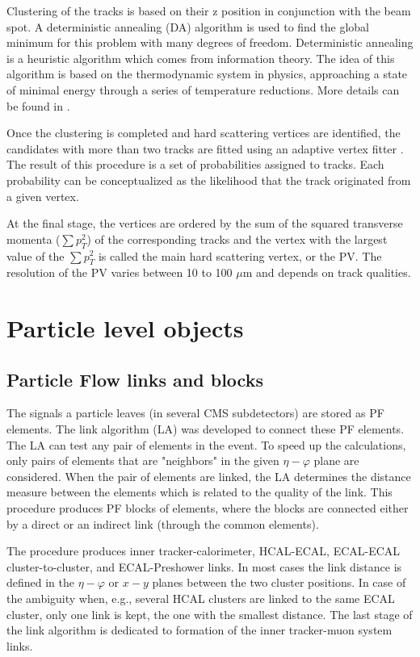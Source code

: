Clustering of the tracks is based on their z position in conjunction with the beam spot. A deterministic annealing (DA) algorithm is used to find the global minimum for this problem with many degrees of freedom. Deterministic annealing is a heuristic algorithm which comes from information theory. The idea of this algorithm is based on the thermodynamic system in physics, approaching a state of minimal energy through a series of temperature reductions. More details can be found in \cite{DeterministicAnnealing}. 

Once the clustering is completed and hard scattering vertices are identified, the candidates with more than two tracks are fitted using an adaptive vertex fitter \cite{AdaptiveVertexFitting}. The result of this procedure is a set of probabilities assigned to tracks. Each probability can be conceptualized as the likelihood that the track originated from a given vertex.

At the final stage, the vertices are ordered by the sum of the squared transverse momenta ($\sum p_T^2$) of the corresponding tracks and the vertex with the largest value of the $\sum p_T^2$ is called the main hard scattering vertex, or the PV. The resolution of the PV varies between 10 to 100 $\mu$m and depends on track qualities. 

\section{Particle level objects}\label{sec:pf_objects}
\subsection{Particle Flow links and blocks}\label{sec:some_reconstruction}

The signals a particle leaves (in several CMS subdetectors) are stored as PF \cite{ParticleFlow} elements. The link algorithm (LA) was developed to connect these PF elements. The LA can test any pair of elements in the event. To speed up the calculations, only pairs of elements that are "neighbors" in the given $\eta - \varphi$ plane are considered. When the pair of elements are linked, the LA determines the distance measure between the elements which is related to the quality of the link. This procedure produces PF blocks of elements, where the blocks are connected either by a direct or an indirect link (through the common elements).

The procedure produces inner tracker-calorimeter, HCAL-ECAL, ECAL-ECAL  cluster-to-cluster, and ECAL-Preshower links. In most cases the link distance is defined in the $\eta-\varphi$ or $x-y$ planes between the two cluster positions. In case of the ambiguity when, e.g., several HCAL clusters are linked to the same ECAL cluster, only one link is kept, the one with the smallest distance. The last stage of the link algorithm is dedicated to formation of the inner tracker-muon system links. 

